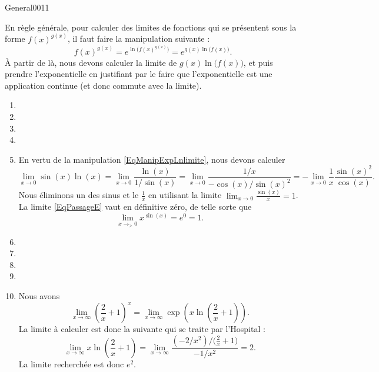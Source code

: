 \begin{corrige}{General0011}

En règle générale, pour calculer des limites de fonctions qui se présentent sous la forme $f(x)^{g(x)}$, il faut faire la manipulation suivante :
\begin{equation}	\label{EqManipExpLnlimite}
	f(x)^{g(x)}= e^{\ln\big( f(x)^{g(x)} \big)}= e^{g(x)\ln\big( f(x) \big)}.
\end{equation}
À partir de là, nous devons calculer la limite de $g(x)\ln\big( f(x) \big)$, et puis prendre l'exponentielle en justifiant par le faire que l'exponentielle est une application continue (et donc commute avec la limite).

\begin{enumerate}

\item
\item
\item
\item
\item
En vertu de la manipulation \eqref{EqManipExpLnlimite}, nous devons calculer
\begin{equation}		\label{EqPassageE}
	\lim_{x\to 0} \sin(x)\ln(x)=\lim_{x\to 0} \frac{ \ln(x) }{ 1/\sin(x) }=\lim_{x\to 0} \frac{ 1/x }{ -\cos(x)/\sin(x)^2 }=-\lim_{x\to 0} \frac{1}{ x }\frac{ \sin(x)^2 }{ \cos(x) }.
\end{equation}
Nous éliminons un des sinus et le $\frac{1}{ x }$ en utilisant la limite $\lim_{x\to 0} \frac{ \sin(x) }{ x }=1$. La limite \eqref{EqPassageE} vaut en définitive zéro, de telle sorte que
\begin{equation}
	\lim_{x\to_> 0} x^{\sin(x)}= e^{0}=1.
\end{equation}

\item
\item
\item
\item
\item

Nous avons
\begin{equation}
	\lim_{x\to \infty} \left( \frac{ 2 }{ x }+1 \right)^x=\lim_{x\to \infty} \exp\left( x\ln(\frac{ 2 }{ x }+1) \right).
\end{equation}
La limite à calculer est donc la suivante qui se traite par l'Hospital :
\begin{equation}
	\lim_{x\to \infty} x\ln\left( \frac{ 2 }{ x }+1 \right)=\lim_{x\to \infty} \frac{  (-2/x^2)/\big( \frac{ 2 }{ x }+1 \big)     }{ -1/x^2 }=2.
\end{equation}
La limite recherchée est donc $e^2$.


\end{enumerate}
\end{corrige}
